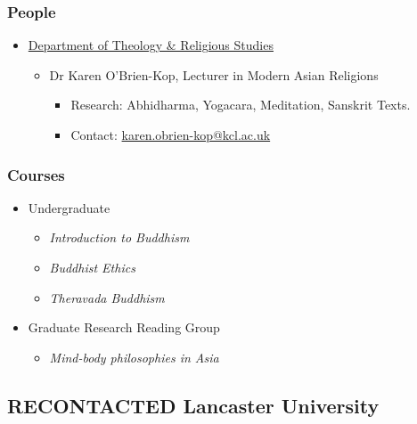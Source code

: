 \documentclass[11pt]{article}
\begin{document}
\subsubsection*{People}
\label{sec:org7cc1bdb}
\begin{itemize}
\item \href{https://www.kcl.ac.uk/trs}{Department of Theology \& Religious Studies}
\label{sec:org453f746}
\begin{itemize}
\item Dr Karen O'Brien-Kop, Lecturer in Modern Asian Religions
\label{sec:orgf4ef23f}
\begin{itemize}
\item Research: Abhidharma, Yogacara, Meditation, Sanskrit Texts.\\
\item Contact: \href{mailto:karen.obrien-kop@kcl.ac.uk}{karen.obrien-kop@kcl.ac.uk}\\
\end{itemize}
\end{itemize}
\end{itemize}
\subsubsection*{Courses}
\label{sec:org9d2de17}
\begin{itemize}
\item Undergraduate
\label{sec:org76e2682}
\begin{itemize}
\item \emph{Introduction to Buddhism}\\
\item \emph{Buddhist Ethics}\\
\item \emph{Theravada Buddhism}\\
\end{itemize}
\item Graduate Research Reading Group
\label{sec:org3b189cf}
\begin{itemize}
\item \emph{Mind-body philosophies in Asia}\\
\end{itemize}
\end{itemize}
\subsection*{{\bfseries\sffamily RECONTACTED} Lancaster University}
\label{sec:org267e132}
\end{document}
